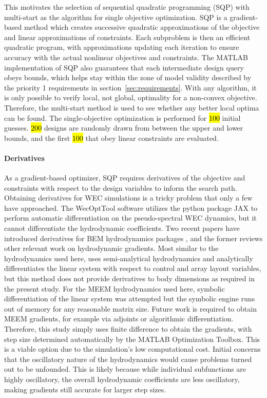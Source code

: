 This motivates the selection of sequential quadratic programming (SQP) with multi-start as the algorithm for single objective optimization. SQP is a gradient-based method which creates successive quadratic approximations of the objective and linear approximations of constraints. Each subproblem is then an efficient quadratic program, with approximations updating each iteration to ensure accuracy with the actual nonlinear objectives and constraints. The MATLAB implementation of SQP also guarantees that each intermediate design query obeys bounds, which helps stay within the zone of model validity described by the priority 1 requirements in section~\ref{sec:requirements}. With any algorithm, it is only possible to verify local, not global, optimality for a non-convex objective. Therefore, the multi-start method is used to see whether any better local optima can be found. The single-objective optimization is performed for \hl{100} initial guesses. \hl{200} designs are randomly drawn from between the upper and lower bounds, and the first \hl{100} that obey linear constraints are evaluated. %

\paragraph{Derivatives}
As a gradient-based optimizer, SQP requires derivatives of the objective and constraints with respect to the design variables to inform the search path. Obtaining derivatives for WEC simulations is a tricky problem that only a few have approached. The WecOptTool software utilizes the python package JAX \cite{bradbury_jax_2018} to perform automatic differentiation on the pseudo-spectral WEC dynamics, but it cannot differentiate the hydrodynamic coefficients. Two recent papers have introduced derivatives for BEM hydrodynamics packages \cite{rohrer_analytical_2024, khanal_fully_2025}, and the former reviews other relevant work on hydrodynamic gradients. Most similar to the hydrodynamics used here, \cite{gambarini_gradient_2024} uses semi-analytical hydrodynamics and analytically differentiates the linear system with respect to control and array layout variables, but this method does not provide derivatives to body dimensions as required in the present study. For the MEEM hydrodynamics used here, symbolic differentiation of the linear system was attempted but the symbolic engine runs out of memory for any reasonable matrix size. Future work is required to obtain MEEM gradients, for example via adjoints or algorithmic differentiation. Therefore, this study simply uses finite difference to obtain the gradients, with step size determined automatically by the MATLAB Optimization Toolbox. This is a viable option due to the simulation's low computational cost. Initial concerns that the oscillatory nature of the hydrodynamics would cause problems \cite{mccabe_open-source_2024} turned out to be unfounded. This is likely because while individual subfunctions are highly oscillatory, the overall hydrodynamic coefficients are less oscillatory, making gradients still accurate for larger step sizes. 

